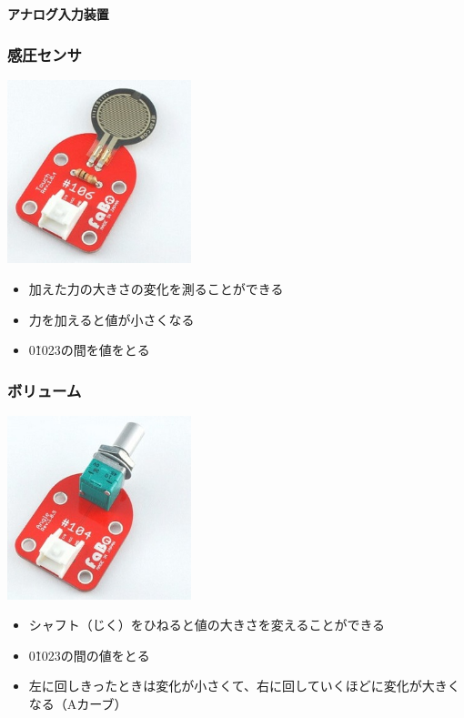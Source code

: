 \begin{frame}[plain]
    \begin{center}
        \vspace{48pt}
        {\huge\bf アナログ入力装置}
    \end{center}
\end{frame}

\begin{frame}
    \frametitle{感圧センサ}
    \begin{center}
        \includegraphics[width=0.4\textwidth]{images/chap05/text05-img021.jpg}
        \begin{itemize}
            \item 加えた力の大きさの変化を測ることができる
            \item 力を加えると値が小さくなる
            \item 0\~1023の間を値をとる
        \end{itemize}
    \end{center}
\end{frame}

\begin{frame}
    \frametitle{ボリューム}
    \begin{center}
        \includegraphics[width=0.4\textwidth]{images/chap05/text05-img022.jpg}
        \begin{itemize}
            \item シャフト（じく）をひねると値の大きさを変えることができる
            \item 0\~1023の間の値をとる
            \item 左に回しきったときは変化が小さくて、右に回していくほどに変化が大きくなる（Aカーブ）
        \end{itemize}
    \end{center}
\end{frame}

